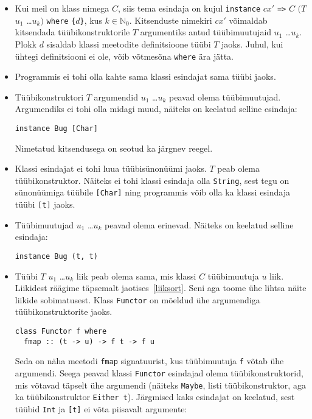 \documentclass[12pt]{article}
\begin{document}
        \begin{itemize}
          \item
            Kui meil on klass nimega $C$, siis tema esindaja on kujul \verb!instance! $cx'$ \verb!=>! $C$ $(T$ $u_1$ \ldots $u_k)$ \verb!where! \verb!{!$d$\verb!}!, kus $k\in\mathbb{N}_0$. Kitsenduste nimekiri $cx'$ võimaldab kitsendada tüübikonstruktorile $T$ argumentiks antud tüübimuutujaid $u_1$ \ldots $u_k$. Plokk $d$ sisaldab klassi meetodite definitsioone tüübi $T$ jaoks. Juhul, kui ühtegi definitsiooni ei ole, võib võtmesõna \verb!where! ära jätta.
          \item
            Programmis ei tohi olla kahte sama klassi esindajat sama tüübi jaoks.
          \item
            Tüübikonstruktori $T$ argumendid $u_1$ \ldots $u_k$ peavad olema tüübimuutujad. Argumendiks ei tohi olla midagi muud, näiteks on keelatud selline esindaja:

            \begin{verbatim}instance Bug [Char]\end{verbatim}

            Nimetatud kitsendusega on seotud ka järgnev reegel.
          \item
            Klassi esindajat ei tohi luua tüübisünonüümi jaoks. $T$ peab olema tüübikonstruktor. Näiteks ei tohi klassi esindaja olla \verb!String!, sest tegu on sünonüümiga tüübile \verb![Char]! ning programmis võib olla ka klassi esindaja tüübi \verb![t]! jaoks.
          \item
            Tüübimuutujad $u_1$ \ldots $u_k$ peavad olema erinevad. Näiteks on keelatud selline esindaja:

            \begin{verbatim}instance Bug (t, t)\end{verbatim}
          \item
            Tüübi $T$ $u_1$ \ldots $u_k$ liik peab olema sama, mis klassi $C$ tüübimuutuja $u$ liik. Liikidest räägime täpsemalt jaotises~\ref{liiksort}. Seni aga toome ühe lihtsa näite liikide sobimatusest. Klass \verb!Functor! on mõeldud ühe argumendiga tüübikonstruktorite jaoks.

            \begin{verbatim}class Functor f where
  fmap :: (t -> u) -> f t -> f u\end{verbatim}

            Seda on näha meetodi \verb!fmap! signatuurist, kus tüübimuutuja \verb!f! võtab ühe argumendi. Seega peavad klassi \verb!Functor! esindajad olema tüübikonstruktorid, mis võtavad täpselt ühe argumendi (näiteks \verb!Maybe!, listi tüübikonstruktor, aga ka tüübikonstruktor \verb!Either t!). Järgmised kaks esindajat on keelatud, sest tüübid \verb!Int! ja \verb![t]! ei võta piisavalt argumente:


\end{itemize}
\end{document}
